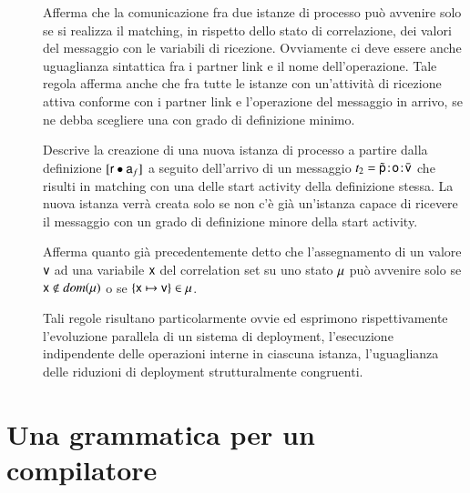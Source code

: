 \begin{description}
\item[] Afferma che la comunicazione fra due istanze di
 processo può avvenire solo se si realizza il matching, in rispetto dello stato
 di correlazione, dei valori del messaggio con le variabili di ricezione.
 Ovviamente ci deve essere anche uguaglianza sintattica fra i partner link e
 il nome dell'operazione. Tale regola afferma anche che fra tutte le istanze
 con un'attività di ricezione attiva conforme con i partner link e l'operazione
 del messaggio in arrivo, se ne debba scegliere una con grado di
 definizione minimo.
 \item[] Descrive la creazione di una nuova istanza di
 processo a partire dalla definizione $[{\sf r} \bullet {\sf a}_f]$ a seguito
 dell'arrivo di un messaggio $t_2 =
  \tilde{{\sf p}}\! : \! {\sf o}\! : \! \bar{{\sf v}}$ che risulti in matching con una delle start activity della
 definizione stessa. La nuova istanza verrà creata solo se non
 c'è già un'istanza capace di ricevere il messaggio con un grado di
 definizione minore della start activity.
 \item[] Afferma quanto già precedentemente detto che
 l'assegnamento di un valore ${\sf v}$ ad una variabile ${\sf x}$ del correlation set
 su uno stato ${\sf \mu}$ può avvenire solo se $ {\sf x} \notin dom({\sf \mu})$ o se $
 \{{\sf x} \mapsto {\sf v}\} \in {\sf \mu}$.
 \item[  ]
 Tali regole risultano particolarmente ovvie ed esprimono rispettivamente
 l'evoluzione parallela di un sistema di deployment, l'esecuzione
 indipendente delle operazioni interne in ciascuna istanza, l'uguaglianza delle
 riduzioni di deployment strutturalmente congruenti.
\end{description}

\section{Una grammatica per un compilatore 
}
\label{gram}

